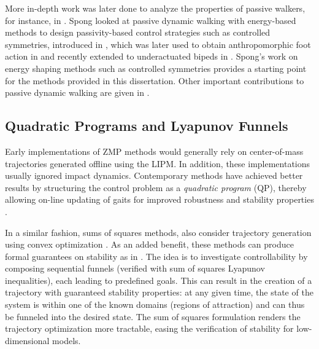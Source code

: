 More in-depth work was later done to analyze the properties of passive walkers,
for instance, in \cite{Espiau1994, Garcia1998, Borzova2004}.
%
Spong \cite{Spong1999} looked at passive dynamic walking with energy-based
methods to design passivity-based control strategies such as controlled
symmetries, introduced in \cite{Spong2005}, which was later used to obtain
anthropomorphic foot action in \cite{Sinnet2009, Sinnet2009a} and recently
extended to underactuated bipeds in \cite{Hu2011}.
%
Spong's work on energy shaping methods such as controlled symmetries provides a
starting point for the methods provided in this dissertation.
%
Other important contributions to passive dynamic walking are given in
\cite{Anderson2005, Kuo1999, Kuo2002, Wisse2007}.


\subsection{Quadratic Programs and Lyapunov Funnels}

Early implementations of ZMP methods would generally rely on center-of-mass
trajectories generated offline using the LIPM.
%
In addition, these implementations usually ignored impact dynamics.
%
Contemporary methods have achieved better results by structuring the control
problem as a {\em quadratic program} (QP), thereby allowing on-line updating of
gaits for improved robustness and stability properties \cite{Kudoh2002,
  Stephens2010, Herdt2010}.
%

In a similar fashion, sums of squares methods, also consider trajectory
generation using convex optimization \cite{Tedrake2010}.
%
As an added benefit, these methods can produce formal guarantees on stability as
in \cite{Majumdar2013}.
%
The idea is to investigate controllability by composing sequential funnels
(verified with sum of squares Lyapunov inequalities), each leading to predefined
goals.
%
This can result in the creation of a trajectory with guaranteed stability
properties:
%
at any given time, the state of the system is within one of the known domains
(regions of attraction) and can thus be funneled into the desired state.
%
The sum of squares formulation renders the trajectory optimization more
tractable, easing the verification of stability for low-dimensional models.
